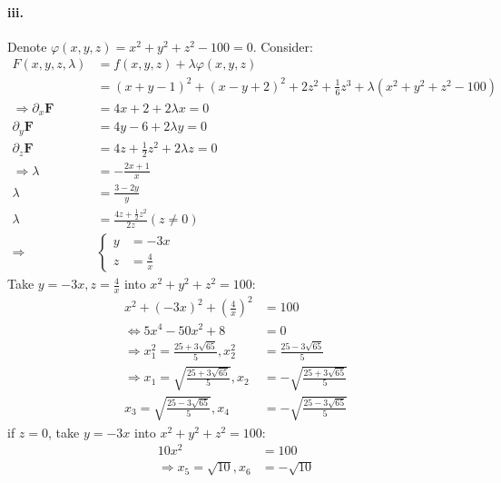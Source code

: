 \documentclass[11pt, a4paper]{article}
\begin{document}
\paragraph{iii.}
Denote $\varphi(x, y, z) = x^2 + y^2 + z^2 - 100 = 0$. Consider:
$$\begin{aligned}
    F(x, y, z, \lambda) &= f(x, y, z) + \lambda\varphi(x, y, z) \\
    &= (x + y - 1)^2 + (x - y + 2)^2 + 2z^2 + \frac{1}{6}z^3 + \lambda(x^2 + y^2 + z^2 - 100) \\
    \Rightarrow \partial_x\bm{F} &= 4x + 2 + 2\lambda x = 0 \\
    \partial_y\bm{F} &= 4y - 6 + 2\lambda y = 0 \\
    \partial_z\bm{F} &= 4z + \frac{1}{2}z^2 + 2\lambda z = 0 \\
    \Rightarrow \lambda &= -\frac{2x + 1}{x} \\
    \lambda &= \frac{3 - 2y}{y} \\
    \lambda &= \frac{4z + \frac{1}{2}z^2}{2z} (z \neq 0)\\
    \Rightarrow
    &\left\{
        \begin{aligned}
            y &= -3x \\
            z &= \frac{4}{x}
        \end{aligned} 
    \right.
\end{aligned}$$
Take $y = -3x, z = \frac{4}{x}$ into $x^2 + y^2 + z^2 = 100$:
$$\begin{aligned}
    x^2 + (-3x)^2 + (\frac{4}{x})^2 &= 100 \\
    \Leftrightarrow 5x^4 -50x^2 + 8 &= 0 \\
    \Rightarrow x^2_1 = \frac{25 + 3\sqrt{65}}{5}, x^2_2 &= \frac{25 - 3\sqrt{65}}{5} \\
    \Rightarrow x_1 = \sqrt{\frac{25 + 3\sqrt{65}}{5}}, x_2 &= -\sqrt{\frac{25 + 3\sqrt{65}}{5}} \\
    x_3 = \sqrt{\frac{25 - 3\sqrt{65}}{5}}, x_4 &= -\sqrt{\frac{25 - 3\sqrt{65}}{5}}
\end{aligned}$$
if $z = 0$, take $y = -3x$ into $x^2 + y^2 + z^2 = 100$:
$$\begin{aligned}
    10x^2 &= 100 \\
    \Rightarrow x_5 = \sqrt{10}, x_6 &= -\sqrt{10}
\end{aligned}$$
\end{document}
